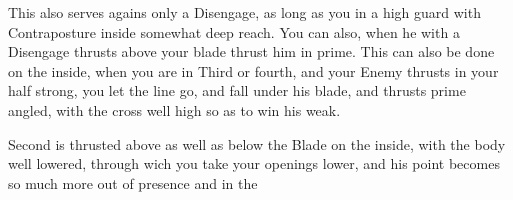 This also serves agains only a Disengage, as long as you in a high
guard with Contraposture inside somewhat deep reach. You can also,
when he with a Disengage thrusts above your blade thrust him in prime.
This can also be done on the inside, when you are in Third or fourth,
and your Enemy thrusts in your half strong, you let the line go, and
fall under his blade, and thrusts prime angled, with the cross well
high so as to win his weak.


Second is thrusted above as well as below the Blade on the inside,
with the body well lowered, through wich you take your openings lower,
and his point becomes so much more out of presence and in the